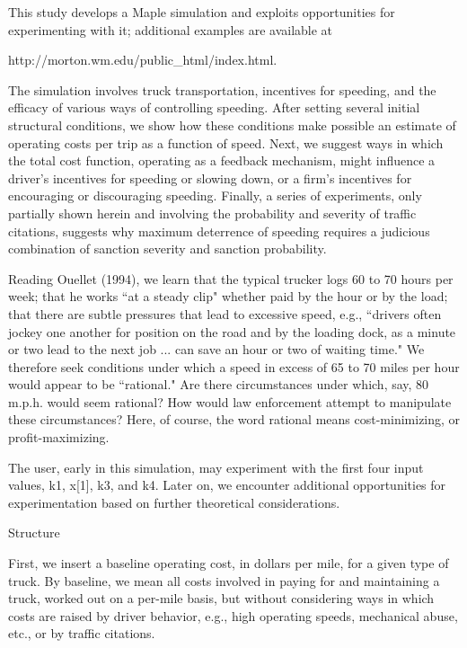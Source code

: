 \documentclass{article}
\begin{document}
\begin{maplegroup}

This study develops a Maple simulation and exploits opportunities for
experimenting with it; additional examples are available at

http://morton.wm.edu/public\_html/index.html.

The simulation involves truck transportation, incentives for speeding,
and the efficacy of various ways of controlling speeding. After
setting several initial structural conditions, we show how these
conditions make possible an estimate of operating costs per trip as a
function of speed. Next, we suggest ways in which the total cost
function, operating as a feedback mechanism, might influence a
driver's incentives for speeding or slowing down, or a firm's
incentives for encouraging or discouraging speeding. Finally, a series
of experiments, only partially shown herein and involving the
probability and severity of traffic citations, suggests why maximum
deterrence of speeding requires a judicious combination of sanction
severity and sanction probability.

Reading Ouellet (1994), we learn that the typical trucker logs 60 to
70 hours per week; that he works ``at a steady clip" whether paid by
the hour or by the load; that there are subtle pressures that lead to
excessive speed, e.g., ``drivers often jockey one another for position
on the road and by the loading dock, as a minute or two lead to the
next job ... can save an hour or two of waiting time." We therefore
seek conditions under which a speed in excess of 65 to 70 miles per
hour would appear to be ``rational." Are there circumstances under
which, say, 80 m.p.h. would seem rational? How would law enforcement
attempt to manipulate these circumstances? Here, of course, the word
rational means cost-minimizing, or profit-maximizing.

The user, early in this simulation, may experiment with the first four
input values, k1, x[1], k3, and k4. Later on, we encounter additional
opportunities for experimentation based on further theoretical
considerations.

\begin{Heading 3}
Structure
\end{Heading 3}

First, we insert a baseline operating cost, in dollars per mile, for a
given type of truck. By baseline, we mean all costs involved in paying
for and maintaining a truck, worked out on a per-mile basis, but
without considering ways in which costs are raised by driver behavior,
e.g., high operating speeds, mechanical abuse, etc., or by traffic
citations.


\end{maplegroup}
\end{document}
